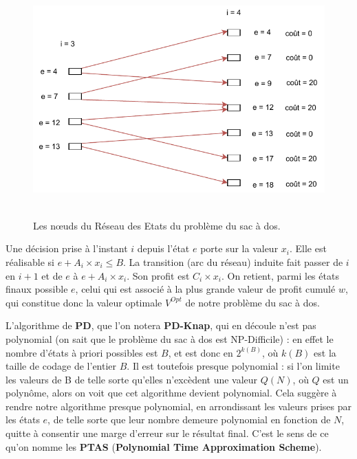 \begin{figure}[H]
	\centerline{
		\includegraphics[height=9cm]{images_these/Etats_Knapsack.pdf}}
	\caption[Les nœuds du Réseau des Etats du problème du sac à dos. ]{Les nœuds du Réseau des Etats du problème du sac à dos.}
	\label{Etats_Knapsack}
\end{figure}

Une décision prise à l'instant $i$ depuis l'état $e$ porte sur la valeur $x_i$. Elle est réalisable si $e + A_i \times x_i \leq B$. La transition (arc du réseau) induite fait passer de $i$ en $i+1$ et de $e$ à $e + A_i\times x_i$. Son profit est $C_i\times x_i$. On retient, parmi les états finaux possible $e$, celui qui est associé à la plus grande valeur de profit cumulé $w$, qui constitue donc la valeur optimale $V^{Opt}$ de notre problème du sac à dos.

L'algorithme de \textbf{PD}, que l'on notera \textbf{PD-Knap}, qui en découle n'est pas polynomial (on sait que le problème du sac à dos est NP-Difficile) : en effet le nombre d'états à priori possibles est $B$, et est donc en $2^{k(B)}$, où $k(B)$ est la taille de codage de l'entier $B$. Il est toutefois presque polynomial : si l'on limite les valeurs de B de telle sorte qu'elles n'excèdent une valeur $Q(N)$, où $Q$ est un polynôme, alors on voit que cet algorithme devient polynomial. Cela suggère à rendre notre algorithme presque polynomial, en arrondissant les valeurs prises par les états $e$, de telle sorte que leur nombre demeure polynomial en fonction de $N$, quitte à consentir une marge d'erreur sur le résultat final. C'est le sens de ce qu'on nomme les \textbf{PTAS} (\textbf{Polynomial Time Approximation Scheme}).

